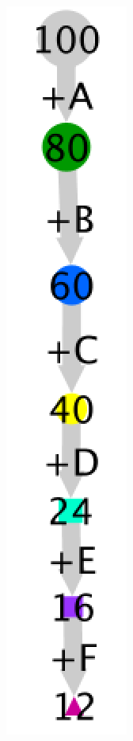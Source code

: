 \documentclass{article}
\begin{document}
\begin{figure}[h]
\begin{subfigure}[t]{0.16\linewidth}
		\caption{}
		\label{1}
	\end{subfigure}
	\hspace{0.07\linewidth}
	\begin{subfigure}[t]{0.0452\linewidth}
		\centering
		\includegraphics[width = 1.0\linewidth, trim={0 0 0 0}, clip=true]{graph2.png}

\end{subfigure}
\end{figure}
\end{document}
